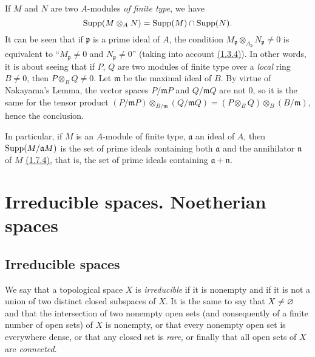 \begin{env}[1.7.5]
\label{env-0.1.7.5}
If $M$ and $N$ are two $A$-modules {\em of finite type}, we have
\[
  {\mathop{\mathrm{Supp}}\nolimits}(M\otimes_A N)={\mathop{\mathrm{Supp}}\nolimits}(M)\cap{\mathop{\mathrm{Supp}}\nolimits}(N).
\]
It can be seen that if $\mathfrak{p}$ is a prime ideal of $A$, the condition
$M_\mathfrak{p}\otimes_{A_\mathfrak{p}}N_\mathfrak{p}\neq 0$ is equivalent to
``$M_\mathfrak{p}\neq 0$ and $N_\mathfrak{p}\neq 0$'' (taking into account
\hyperref[env-0.1.3.4]{(1.3.4)}). In other words, it is about seeing that if $P$, $Q$ are two
modules of finite type over a {\em local} ring $B\neq 0$, then
$P\otimes_B Q\neq 0$. Let $\mathfrak{m}$ be the maximal ideal of $B$. By virtue
of Nakayama's Lemma, the vector spaces $P/\mathfrak{m}P$ and $Q/\mathfrak{m}Q$
are not $0$, so it is the same for the tensor product
$(P/\mathfrak{m}P)\otimes_{B/\mathfrak{m}}(Q/\mathfrak{m}Q)
  =(P\otimes_B Q)\otimes_B(B/\mathfrak{m})$, hence the conclusion.

In particular, if $M$ is an $A$-module of finite type, $\mathfrak{a}$ an ideal
of $A$, then ${\mathop{\mathrm{Supp}}\nolimits}(M/\mathfrak{a}M)$ is the set of prime ideals containing both
$\mathfrak{a}$ and the annihilator $\mathfrak{n}$ of $M$ \hyperref[env-0.1.7.4]{(1.7.4)}, that
is, the set of prime ideals containing $\mathfrak{a}+\mathfrak{n}$.
\end{env}

\section{Irreducible spaces. Noetherian spaces}
\label{section-irreducible-and-noetherian-spaces}

\subsection{Irreducible spaces}
\label{subsection-irreducible-spaces}

\begin{env}[2.1.1]
\label{env-0.2.1.1}
We say that a topological space $X$ is {\em irreducible} if it is nonempty and
if it is not a union of two distinct closed subspaces of $X$. It is the same to
say that $X\neq\varnothing$ and that the intersection of two nonempty open sets (and
consequently of a finite number of open sets) of $X$ is nonempty, or that every
nonempty open set is everywhere dense, or that any closed set is {\em rare}, or
finally that all open sets of $X$ are {\em connected}.
\end{env}

